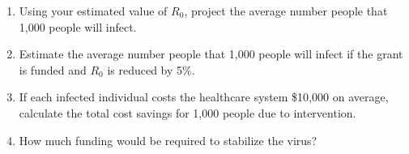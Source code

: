 \documentclass[11pt]{article}
\begin{document}
\begin{enumerate}
\begin{enumerate}
    \item[(a)]  Using your estimated value of $R_0$, project the average number people that 1{,}000 people will infect.
        \vspace{3cm}
    \item[(b)]  Estimate the average number people that 1{,}000 people will infect if the grant is funded and $R_0$ is reduced by 5\%.
        \vspace{3cm}
    \item[(c)]  If each infected individual costs the healthcare system \$10{,}000 on average, calculate the total cost savings  for 1{,}000 people due to intervention.
        \vspace{3cm}
    \item[(d)] How much funding would be required to stabilize the virus?
        \vspace{3cm}

\end{enumerate}

\end{enumerate}
\end{document}
